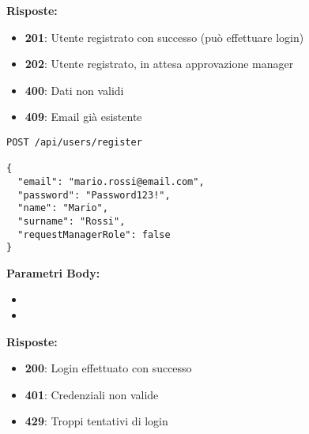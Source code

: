 \textbf{Risposte:}
\begin{itemize}
    \item \textbf{201}: Utente registrato con successo (può effettuare login)
    \item \textbf{202}: Utente registrato, in attesa approvazione manager
    \item \textbf{400}: Dati non validi
    \item \textbf{409}: Email già esistente
\end{itemize}

\begin{lstlisting}[caption=Esempio Registrazione Utente]
POST /api/users/register

{
  "email": "mario.rossi@email.com",
  "password": "Password123!",
  "name": "Mario",
  "surname": "Rossi",
  "requestManagerRole": false
}
\end{lstlisting}


\textbf{Parametri Body:}
\begin{itemize}
    \item {}
    \item {}
\end{itemize}

\textbf{Risposte:}
\begin{itemize}
    \item \textbf{200}: Login effettuato con successo
    \item \textbf{401}: Credenziali non valide
    \item \textbf{429}: Troppi tentativi di login
\end{itemize}







